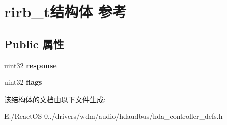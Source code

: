 \hypertarget{structrirb__t}{}\section{rirb\+\_\+t结构体 参考}
\label{structrirb__t}
\subsection*{Public 属性}
\begin{DoxyCompactItemize}
\item 
\mbox{\label{structrirb__t_ae7e1e770f41b0ec7917b15ff421c53df}} 
uint32 {\bfseries response}
\item 
\mbox{\label{structrirb__t_a246e14c444115682af7578d18de6c458}} 
uint32 {\bfseries flags}
\end{DoxyCompactItemize}


该结构体的文档由以下文件生成\+:\begin{DoxyCompactItemize}
\item 
E\+:/\+React\+O\+S-\/0../drivers/wdm/audio/hdaudbus/hda\+\_\+controller\+\_\+defs.\+h\end{DoxyCompactItemize}
